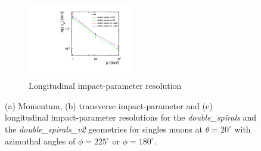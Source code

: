 \begin{figure}[H]
\begin{subfigure}[b]{\textwidth}
          \centering
          \includegraphics[width=0.5\textwidth]{Figures/Geometries/z0_resolution_double_spirals_v2_theta20.pdf}
          \caption{Longitudinal impact-parameter resolution}
          \label{}
        \end{subfigure}
        \caption{(a) Momentum, (b) transverse impact-parameter and
          (c) longitudinal impact-parameter resolutions for the
          {\it double\_spirals} and the {\it double\_spirals\_v2} geometries for
          singles muons at $\theta = 20^\circ$ with azimuthal angles
          of  $\phi = 225^\circ$ or $\phi = 180^\circ$.}\label{fig:doubleSpiralsV2Res20}
\end{figure}
